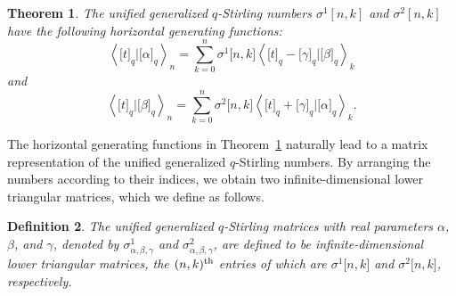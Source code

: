 \documentclass[12pt]{article}
\newtheorem{thm}{Theorem}[section]
\newtheorem{defn}[thm]{Definition}
\begin{document}
\begin{thm} \label{thm1}
	The unified generalized $q$-Stirling numbers $\sigma^1[n,k]$ and $\sigma^2[n,k]$ have the following horizontal generating functions:
	\begin{equation}
		\left\langle\big[t\big]_q|\big[\alpha\big]_q\right\rangle_n=\sum_{k=0}^{n}\sigma^1\big[n,k\big]\left\langle\big[t\big]_q-\big[\gamma\big]_q|\big[\beta\big]_q\right\rangle_k \label{result1}
	\end{equation} 
	and
	\begin{equation}
		\left\langle\big[t\big]_q|\big[\beta\big]_q\right\rangle_n=\sum_{k=0}^{n}\sigma^2\big[n,k\big]\left\langle\big[t\big]_q+\big[\gamma\big]_q|\big[\alpha\big]_q\right\rangle_k.\label{result2}
	\end{equation} 
\end{thm}

The horizontal generating functions in Theorem~\ref{thm1} naturally lead to a matrix representation of the unified generalized $q$-Stirling numbers. By arranging the numbers according to their indices, we obtain two infinite-dimensional lower triangular matrices, which we define as follows.

\begin{defn}\label{defnmajor}\rm 
	The unified generalized $q$-Stirling matrices with real parameters $\alpha$, $\beta$, and $\gamma$, denoted by $\sigma^1_{\alpha,\beta,\gamma}$ and $\sigma^2_{\alpha,\beta,\gamma}$, are defined to be infinite-dimensional lower triangular matrices, the $(n,k)^{\rm th}$ entries of which are $\sigma^1\big[n,k\big]$ and $\sigma^2\big[n,k\big]$, respectively.
\end{defn}
\end{document}
